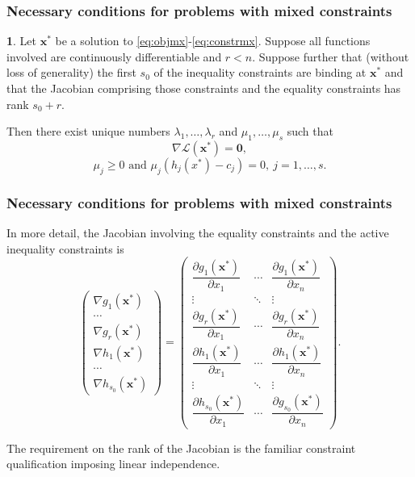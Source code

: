 \documentclass[10pt]{beamer}
\theoremstyle{definition}
\newtheorem{Fact}{\translate{Fact}}
\begin{document}
\begin{frame}[fragile]
\frametitle{Necessary conditions for problems with mixed constraints}
\begin{Fact}
Let $ \mathbf{x^*} $ be a solution to \eqref{eq:objmx}-\eqref{eq:constrmx}. Suppose all functions involved are continuously differentiable and $ r<n $. Suppose further that (without loss of generality) the first $ s_0 $ of the inequality constraints are binding at $ \mathbf{x^*} $ and that the Jacobian comprising those constraints and the equality constraints has rank $ s_0+r $.

Then there exist unique numbers $ \lambda_1,\ldots,\lambda_r $ and $ \mu_1,\ldots,\mu_s $ such that \[ \nabla \mathcal{L}(\mathbf{x^*}) = \mathbf{0}, \]
\[ \mu_j \geq 0 \text{ and } \mu_j (h_j(x^*)-c_j) = 0,~j=1,\ldots,s. \]
\label{fc:Nsmx}
\end{Fact}
\end{frame}

\begin{frame}[fragile]
\frametitle{Necessary conditions for problems with mixed constraints}
In more detail, the Jacobian involving the equality constraints and the active inequality constraints is \[ \begin{pmatrix}
\nabla g_1(\mathbf{x^*})\\
\cdots \\
\nabla g_r(\mathbf{x^*})\\
\nabla h_1(\mathbf{x^*})\\
\cdots \\
\nabla h_{s_0}(\mathbf{x^*})
\end{pmatrix} = \begin{pmatrix}
\dfrac{\partial g_1 (\mathbf{x^*})}{\partial x_1}  &  \cdots  &  \dfrac{\partial g_1 (\mathbf{x^*})}{\partial x_n} \\
\vdots   &  \ddots  &  \vdots \\
\dfrac{\partial g_{r} (\mathbf{x^*})}{\partial x_1}  &  \cdots  &  \dfrac{\partial g_{r} (\mathbf{x^*})}{\partial x_n}\\
\dfrac{\partial h_1 (\mathbf{x^*})}{\partial x_1}  &  \cdots  &  \dfrac{\partial h_1 (\mathbf{x^*})}{\partial x_n} \\
\vdots   &  \ddots  &  \vdots \\
\dfrac{\partial h_{s_0} (\mathbf{x^*})}{\partial x_1}  &  \cdots  &  \dfrac{\partial g_{s_0} (\mathbf{x^*})}{\partial x_n}
\end{pmatrix}. \] 

The requirement on the rank of the Jacobian is the familiar constraint qualification imposing linear independence.
\end{frame}
\end{document}
